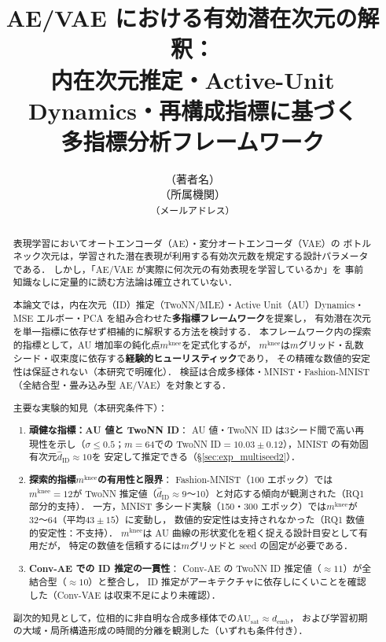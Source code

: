 \documentclass[11pt,a4paper]{jsarticle}
\title{AE/VAE における有効潜在次元の解釈：\\
       内在次元推定・Active-Unit Dynamics・再構成指標に基づく\\
       多指標分析フレームワーク}
\author{（著者名）\\
{\small （所属機関）}\\
{\small \texttt{（メールアドレス）}}}
\date{}
\newcommand{\mknee}{m^{\mathrm{knee}}}
\begin{document}
\maketitle

\begin{abstract}
表現学習においてオートエンコーダ（AE）・変分オートエンコーダ（VAE）の
ボトルネック次元は，学習された潜在表現が利用する有効次元数を規定する設計パラメータである．
しかし，「AE/VAE が実際に何次元の有効表現を学習しているか」を
事前知識なしに定量的に読む方法論は確立されていない．

本論文では，内在次元（ID）推定（TwoNN/MLE）・Active Unit（AU）Dynamics・
MSE エルボー・PCA を組み合わせた\textbf{多指標フレームワーク}を提案し，
有効潜在次元を単一指標に依存せず相補的に解釈する方法を検討する．
本フレームワーク内の探索的指標として，AU 増加率の鈍化点$m^{\mathrm{knee}}$を定式化するが，
$m^{\mathrm{knee}}$は$m$グリッド・乱数シード・収束度に依存する\textbf{経験的ヒューリスティック}であり，
その精確な数値的安定性は保証されない（本研究で明確化）．
検証は合成多様体・MNIST・Fashion-MNIST（全結合型・畳み込み型 AE/VAE）を対象とする．

主要な実験的知見（本研究条件下）：
\begin{enumerate}
  \item \textbf{頑健な指標：AU 値と TwoNN ID}：
        AU 値・TwoNN ID は3シード間で高い再現性を示し（$\sigma \leq 0.5$；$m=64$での
        TwoNN ID$= 10.03 \pm 0.12$），MNIST の有効固有次元$\hat{d}_\mathrm{ID} \approx 10$を
        安定して推定できる（§\ref{sec:exp_multiseed2}）．
  \item \textbf{探索的指標$m^{\mathrm{knee}}$の有用性と限界}：
        Fashion-MNIST（100 エポック）では$m^{\mathrm{knee}} = 12$が
        TwoNN 推定値（$\hat{d}_\mathrm{ID} \approx 9$〜10）と対応する傾向が観測された（RQ1 部分的支持）．
        一方，MNIST 多シード実験（150・300 エポック）では$\mknee$が 32〜64（平均$43 \pm 15$）に変動し，
        数値的安定性は支持されなかった（RQ1 数値的安定性：不支持）．
        $\mknee$は AU 曲線の形状変化を粗く捉える設計目安として有用だが，
        特定の数値を信頼するには$m$グリッドと seed の固定が必要である．
  \item \textbf{Conv-AE での ID 推定の一貫性}：
        Conv-AE の TwoNN ID 推定値（$\approx 11$）が全結合型（$\approx 10$）と整合し，
        ID 推定がアーキテクチャに依存しにくいことを確認した（Conv-VAE は収束不足により未確認）．
\end{enumerate}
副次的知見として，位相的に非自明な合成多様体での$\mathrm{AU}_{\mathrm{sat}} \approx d_{\mathrm{emb}}$，
および学習初期の大域・局所構造形成の時間的分離を観測した（いずれも条件付き）．
\end{abstract}
\end{document}
